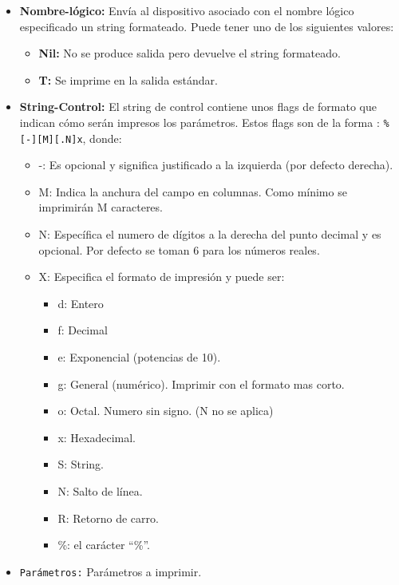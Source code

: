 \documentclass[11pt,svgnames]{scrbook}
\begin{document}
\begin{itemize}
 \item \textbf{Nombre-lógico:} Envía al dispositivo asociado con el nombre
lógico especificado
un string formateado. Puede tener uno de los siguientes valores:
\begin{itemize}
 \item \textbf{Nil:} No se produce salida pero devuelve el string formateado.
\item \textbf{T:} Se imprime en la salida estándar.
\end{itemize}


\item \textbf{String-Control:} El string de control contiene unos flags de
formato que indican
cómo serán impresos los parámetros.  Estos flags son de la forma :
\texttt{\%[-][M][.N]x},
donde:
\begin{itemize}
 \item -: Es opcional y significa justificado a la izquierda (por defecto
derecha).
\item M: Indica la anchura del campo en columnas. Como mínimo se imprimirán M
caracteres.
\item N: Específica el numero de dígitos a la derecha del punto decimal y es
opcional.
Por defecto se toman 6 para los números reales.
\item X: Especifica el formato de impresión y puede ser:
\begin{itemize}
 \item d: Entero
\item f:  Decimal
\item e: Exponencial (potencias de 10).
\item g: General (numérico). Imprimir con el formato mas corto.
\item o: Octal. Numero sin signo. (N no se aplica)
\item x: Hexadecimal.
\item S: String.
\item N: Salto de línea.
\item R: Retorno de carro.
\item \%: el carácter ``\%''.
\end{itemize}

\end{itemize}


\item \texttt{Parámetros:} Parámetros a imprimir.

\end{itemize}
\end{document}
